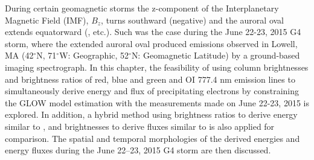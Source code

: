 \documentclass[crop=false,class=mitthesis,oneside,font=12pt]{standalone}
\begin{document}
During certain geomagnetic storms the z-component of the Interplanetary Magnetic Field (IMF), $B_z$, turns southward (negative) and the auroral oval extends equatorward (\citet{holzworthmeng,hardy}, etc.). Such was the case during the June 22-23, 2015 G4 storm, where the extended auroral oval produced emissions observed in Lowell, MA (42$^\circ$N, 71$^\circ$W: Geographic, 52$^\circ$N: Geomagnetic Latitude) by a ground-based imaging spectrograph. In this chapter, the feasibility of using column brightnesses and brightness ratios of red, blue and green and OI 777.4 nm emission lines to simultaneously derive energy and flux of precipitating electrons by constraining the GLOW model estimation with the measurements made on June 22-23, 2015 is explored. In addition, a hybrid method using brightness ratios to derive energy similar to \cite{rees_1974}, and brightnesses to derive fluxes similar to \cite{pallamraju_2011} is also applied for comparison. The spatial and temporal morphologies of the derived energies and energy fluxes during the June 22--23, 2015 G4 storm are then discussed.
\end{document}
